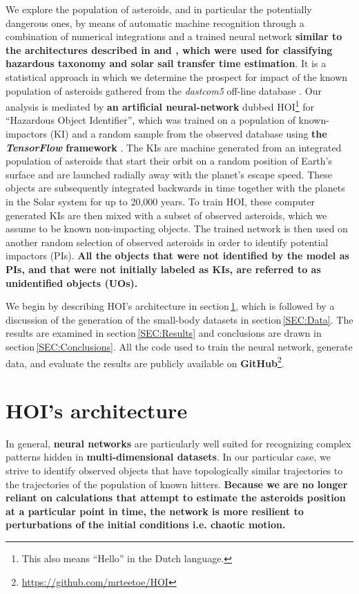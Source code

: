 \documentclass{aa}
\begin{document}
We explore the population of asteroids, and in
particular the potentially dangerous ones, by means of automatic
machine recognition through a combination of numerical integrations and
a trained neural network \textbf{similar to the architectures described in \citep{ref1} and \citep{ref2}, which were used for classifying hazardous taxonomy and solar sail transfer time estimation}. It is a statistical approach in which we
determine the prospect for impact of the known population of asteroids
gathered from the \textit{dastcom5} off-line database \citep{dastcom5}.  Our
analysis is mediated by \textbf{an artificial neural-network} dubbed HOI\footnote{This also means ``Hello'' in the Dutch language.} for ``Hazardous Object Identifier'', which was trained
on a population of known-impactors (KI) and a random sample from the
observed database using \textbf{the \textit{TensorFlow} framework} \citep{TensorFlow}. The KIs are machine generated from an integrated
population of asteroids that start their orbit on a random position of
Earth's surface and are launched radially away with the planet's escape
speed. These objects are subsequently integrated backwards in time
together with the planets in the Solar system for up to 20,000
years. To train HOI, these computer generated KIs are then mixed with a subset of observed asteroids, which we assume to be known non-impacting objects. The trained network is then used on another random selection of observed asteroids
in order to identify potential impactors (PIs). \textbf{All the objects that were not identified by the model as PIs, and that were not initially labeled as KIs, are referred to as unidentified objects (UOs).}

We begin by describing HOI's architecture in section\,\ref{SEC:1D_CNN}, which is followed by a discussion of the generation of the small-body datasets in section\,\ref{SEC:Data}. The results are examined in section\,\ref{SEC:Results} and conclusions are drawn in section\,\ref{SEC:Conclusions}. All the code
used to train the neural network, generate data, and evaluate the
results are publicly available on \textbf{GitHub}\footnote{ \url{https://github.com/mrteetoe/HOI}}.

\section{HOI's architecture}
\label{SEC:1D_CNN}

In general, \textbf{neural networks} are particularly well suited for
recognizing complex patterns hidden in \textbf{multi-dimensional datasets}. In our particular case, we strive to identify observed objects that have topologically similar trajectories to the trajectories of the population of known hitters. \textbf{Because we are no longer reliant on calculations that attempt to estimate the asteroids position at a particular point in time, the network is more resilient to perturbations of the initial conditions i.e. chaotic motion.}
\end{document}
